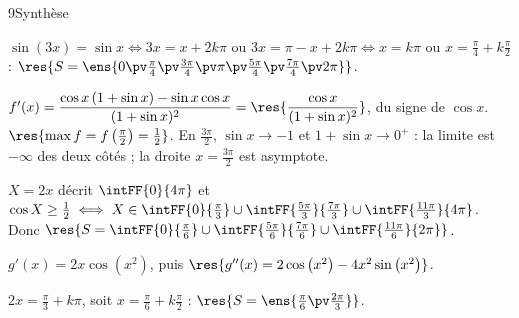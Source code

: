 \begin{corrige}{9}{Synthèse}
\begin{questions}
  \item $\sin(3x)=\sin x\iff3x=x+2k\pi$ ou $3x=\pi-x+2k\pi\iff x=k\pi$ ou $x=\frac{\pi}{4}+k\frac{\pi}{2}$ :
    $\res{S=\ens{0\pv\frac{\pi}{4}\pv\frac{3\pi}{4}\pv\pi\pv\frac{5\pi}{4}\pv\frac{7\pi}{4}\pv2\pi}}$.
\end{questions}
\noindent
\begin{minipage}[t]{0.5\linewidth}\vspace{0pt}\raggedright
\begin{questions}[start=2]
  \item $f'(x)=\dfrac{\cos x\,(1+\sin x)-\sin x\cos x}{(1+\sin x)^{2}}=\res{\dfrac{\cos x}{(1+\sin x)^{2}}}$, du signe de $\cos x$.
    $\res{\max f=f\left(\frac{\pi}{2}\right)=\frac12}$. En $\frac{3\pi}{2}$, $\sin x\to-1$ et $1+\sin x\to0^{+}$ : la limite est
    $-\infty$ des deux côtés ; la droite $x=\frac{3\pi}{2}$ est asymptote.
\end{questions}
\end{minipage}\hfill
\begin{minipage}[t]{0.46\linewidth}\vspace{1mm}
\centering
\begin{tableau}
\end{tableau}
\end{minipage}
\begin{questions}[start=3]
  \item $X=2x$ décrit $\intFF{0}{4\pi}$ et $\cos X\geq\frac12\iff X\in\intFF{0}{\frac{\pi}{3}}\cup\intFF{\frac{5\pi}{3}}{\frac{7\pi}{3}}\cup\intFF{\frac{11\pi}{3}}{4\pi}$.\\
    Donc $\res{S=\intFF{0}{\frac{\pi}{6}}\cup\intFF{\frac{5\pi}{6}}{\frac{7\pi}{6}}\cup\intFF{\frac{11\pi}{6}}{2\pi}}$.
  \item $g'(x)=2x\cos\left(x^{2}\right)$, puis $\res{g''(x)=2\cos\left(x^{2}\right)-4x^{2}\sin\left(x^{2}\right)}$.
  \item $2x=\frac{\pi}{3}+k\pi$, soit $x=\frac{\pi}{6}+k\frac{\pi}{2}$ : $\res{S=\ens{\frac{\pi}{6}\pv\frac{2\pi}{3}}}$.
\end{questions}
\end{corrige}


